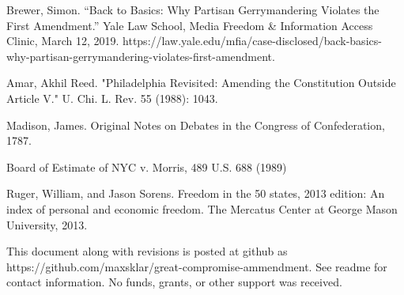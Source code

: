 \documentclass{article}
\begin{document}
\begin{thebibliography}{20}
Brewer, Simon. “Back to Basics: Why Partisan Gerrymandering Violates the First Amendment.” Yale Law School, Media Freedom \& Information Access Clinic, March 12, 2019. https://law.yale.edu/mfia/case-disclosed/back-basics-why-partisan-gerrymandering-violates-first-amendment. 

Amar, Akhil Reed. "Philadelphia Revisited: Amending the Constitution Outside Article V." U. Chi. L. Rev. 55 (1988): 1043.

Madison, James. Original Notes on Debates in the Congress of Confederation, 1787.

Board of Estimate of NYC v. Morris, 489 U.S. 688 (1989)

Ruger, William, and Jason Sorens. Freedom in the 50 states, 2013 edition: An index of personal and economic freedom. The Mercatus Center at George Mason University, 2013.
\end{thebibliography}

This document along with revisions is posted at github as https://github.com/maxsklar/great-compromise-ammendment. See readme for contact information. No funds, grants, or other support was received.
\end{document}
